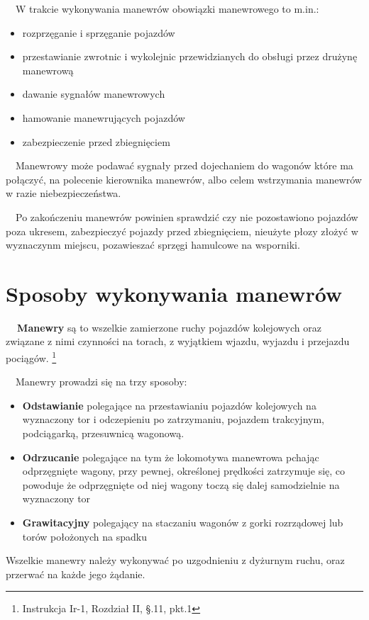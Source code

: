 \ \ W trakcie wykonywania manewrów obowiązki manewrowego to m.in.:

\begin{itemize}
\item rozprzęganie i sprzęganie pojazdów
\item przestawianie zwrotnic i wykolejnic przewidzianych do obsługi przez drużynę manewrową
\item dawanie sygnałów manewrowych
\item hamowanie manewrujących pojazdów
\item zabezpieczenie przed zbiegnięciem
\end{itemize}

\ \ Manewrowy może podawać sygnały przed dojechaniem do wagonów które ma połączyć, na polecenie kierownika manewrów,
albo celem wstrzymania manewrów w razie niebezpieczeństwa.

\ \ Po zakończeniu manewrów powinien sprawdzić czy nie pozostawiono pojazdów poza ukresem, zabezpieczyć pojazdy przed
zbiegnięciem, nieużyte płozy złożyć w wyznaczynm miejscu, pozawieszać sprzęgi hamulcowe na wsporniki.

\chapter{Sposoby wykonywania manewrów}

\textbf{\ \ Manewry} są to wszelkie zamierzone ruchy pojazdów kolejowych oraz związane z nimi czynności na torach, z wyjątkiem wjazdu, wyjazdu i przejazdu pociągów.
\footnote{Instrukcja Ir-1, Rozdział II, \S.11, pkt.1}

\ \ Manewry prowadzi się na trzy sposoby:

\begin{itemize}
\item \textbf{Odstawianie} polegające na przestawianiu pojazdów kolejowych na wyznaczony tor i odczepieniu po
zatrzymaniu, pojazdem trakcyjnym, podciągarką, przesuwnicą wagonową.
\item \textbf{Odrzucanie} polegające na tym że lokomotywa manewrowa pchając odprzęgnięte wagony, przy pewnej, określonej
prędkości zatrzymuje się, co powoduje że odprzęgnięte od niej wagony toczą się dalej samodzielnie na wyznaczony tor
\item \textbf{Grawitacyjny} polegający na staczaniu wagonów z gorki rozrządowej lub torów położonych na spadku
\end{itemize}

Wszelkie manewry należy wykonywać po uzgodnieniu z dyżurnym ruchu, oraz przerwać na każde jego żądanie. 

